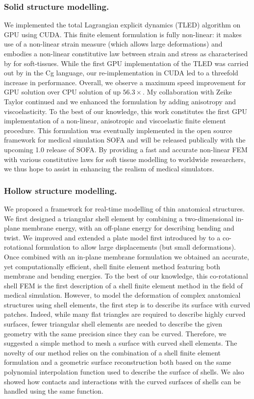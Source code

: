 \subsubsection*{Solid structure modelling.}
We implemented the total Lagrangian explicit dynamics (TLED) algorithm on GPU using CUDA. This finite element formulation is fully non-linear: it makes use of a non-linear strain measure (which allows large deformations) and embodies a non-linear constitutive law between strain and stress as characterised by \cite{Fung93} for soft-tissues. While the first GPU implementation of the TLED was carried out by \cite{Taylor07b} in the Cg language, our re-implementation in CUDA led to a threefold increase in performance. Overall, we observe a maximum speed improvement for GPU solution over CPU solution of up $56.3 \times$. My collaboration with Zeike Taylor continued and we enhanced the formulation by adding anisotropy and viscoelasticity. To the best of our knowledge, this work constitutes the first GPU implementation of a non-linear, anisotropic and viscoelastic finite element procedure. This formulation was eventually implemented in the open source framework for medical simulation SOFA and will be released publically with the upcoming 1.0 release of SOFA. By providing a fast and accurate non-linear FEM with various constitutive laws for soft tissue modelling to worldwide researchers, we thus hope to assist in enhancing the realism of medical simulators. 

\subsubsection*{Hollow structure modelling.}
We proposed a framework for real-time modelling of thin anatomical structures. We first designed a triangular shell element by combining a two-dimensional in-plane membrane energy, with an off-plane energy for describing bending and twist. We improved and extended a plate model first introduced by \cite{Przemieniecki85} to a co-rotational formulation to allow large displacements (but small deformations). Once combined with an in-plane membrane formulation we obtained an accurate, yet computationally efficient, shell finite element method featuring both membrane and bending energies. To the best of our knowledge, this co-rotational shell FEM is the first description of a shell finite element method in the field of medical simulation. However, to model the deformation of complex anatomical structures using shell elements, the first step is to describe its surface with curved patches. Indeed, while many flat triangles are required to describe highly curved surfaces, fewer triangular shell elements are needed to describe the given geometry with the same precision since they can be curved. Therefore, we suggested a simple method to mesh a surface with curved shell elements. The novelty of our method relies on the combination of a shell finite element formulation and a geometric surface reconstruction both based on the same polynomial interpolation function used to describe the surface of shells. We also showed how contacts and interactions with the curved surfaces of shells can be handled using the same function. 


